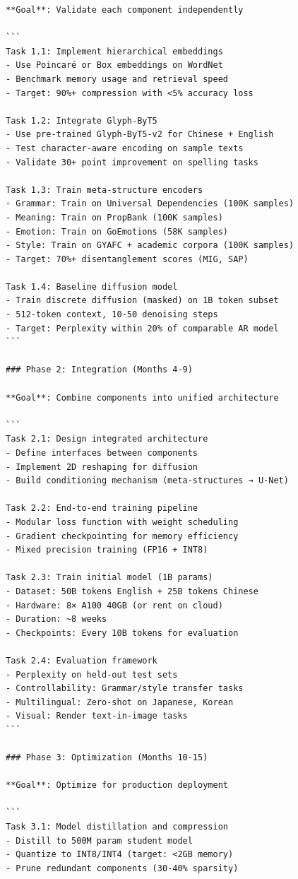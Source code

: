 \documentclass[11pt]{article}
\begin{document}
\begin{verbatim}
**Goal**: Validate each component independently

```
Task 1.1: Implement hierarchical embeddings
- Use Poincaré or Box embeddings on WordNet
- Benchmark memory usage and retrieval speed
- Target: 90%+ compression with <5% accuracy loss

Task 1.2: Integrate Glyph-ByT5
- Use pre-trained Glyph-ByT5-v2 for Chinese + English
- Test character-aware encoding on sample texts
- Validate 30+ point improvement on spelling tasks

Task 1.3: Train meta-structure encoders
- Grammar: Train on Universal Dependencies (100K samples)
- Meaning: Train on PropBank (100K samples)  
- Emotion: Train on GoEmotions (58K samples)
- Style: Train on GYAFC + academic corpora (100K samples)
- Target: 70%+ disentanglement scores (MIG, SAP)

Task 1.4: Baseline diffusion model
- Train discrete diffusion (masked) on 1B token subset
- 512-token context, 10-50 denoising steps
- Target: Perplexity within 20% of comparable AR model
```

### Phase 2: Integration (Months 4-9)

**Goal**: Combine components into unified architecture

```
Task 2.1: Design integrated architecture
- Define interfaces between components
- Implement 2D reshaping for diffusion
- Build conditioning mechanism (meta-structures → U-Net)

Task 2.2: End-to-end training pipeline
- Modular loss function with weight scheduling
- Gradient checkpointing for memory efficiency
- Mixed precision training (FP16 + INT8)

Task 2.3: Train initial model (1B params)
- Dataset: 50B tokens English + 25B tokens Chinese
- Hardware: 8× A100 40GB (or rent on cloud)
- Duration: ~8 weeks
- Checkpoints: Every 10B tokens for evaluation

Task 2.4: Evaluation framework
- Perplexity on held-out test sets
- Controllability: Grammar/style transfer tasks
- Multilingual: Zero-shot on Japanese, Korean
- Visual: Render text-in-image tasks
```

### Phase 3: Optimization (Months 10-15)

**Goal**: Optimize for production deployment

```
Task 3.1: Model distillation and compression
- Distill to 500M param student model
- Quantize to INT8/INT4 (target: <2GB memory)
- Prune redundant components (30-40% sparsity)


\end{verbatim}
\end{document}
